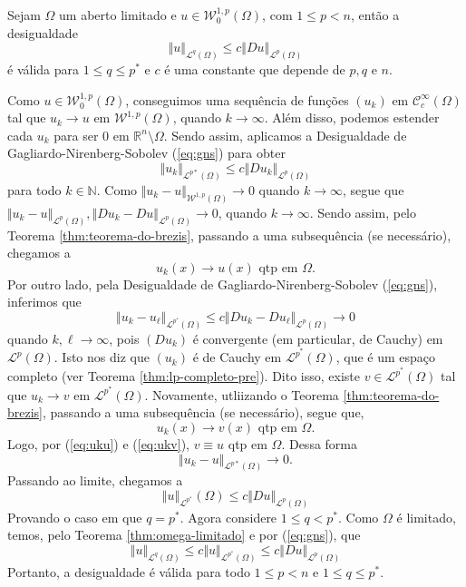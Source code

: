 \documentclass[a4paper, 11pt]{book}
\theoremstyle{definition}
\newcommand{\bN}{\mathbb{N}}
\newcommand{\bR}{\mathbb{R}}
\newcommand{\cC}{\mathcal{C}}
\newcommand{\cL}{\mathcal{L}}
\newcommand{\cW}{\mathcal{W}}
\begin{document}
\begin{tbox}
    Sejam $\Omega$ um aberto limitado e $u \in \cW^{1,p}_0(\Omega)$, com $1 \leqslant p < n$, então a desigualdade
    \[
        \Vert u \Vert_{\cL^q(\Omega)} \leqslant c \Vert Du \Vert_{\cL^p(\Omega)}
    \]
    é válida para $1 \leqslant q \leqslant p^*$ e $c$ é uma constante que depende de $p, q$ e $n$.
\end{tbox}
\begin{prf}
    Como $u \in \cW^{1,p}_0(\Omega)$, conseguimos uma sequência de funções $(u_k)$ em $\cC^{\infty}_c(\Omega)$ tal que $u_k \to u$ em $\cW^{1,p}(\Omega)$, quando $k \to \infty$.
    Além disso, podemos estender cada $u_k$ para ser $0$ em $\bR^n \setminus \Omega$.
    Sendo assim, aplicamos a Desigualdade de Gagliardo-Nirenberg-Sobolev (\ref{eq:gns}) para obter
    \[
        \Vert u_k \Vert_{\cL^{p*}(\Omega)} \leqslant c \Vert Du_k \Vert_{\cL^p(\Omega)}
    \]
    para todo $k \in \bN$.
    Como $\Vert u_k - u \Vert_{\cW^{1,p}(\Omega)} \to 0$ quando $k \to \infty$, segue que $\Vert u_k - u \Vert_{\cL^p(\Omega)}, \Vert Du_k - Du \Vert_{\cL^p(\Omega)} \to 0$, quando $k \to \infty$.
    Sendo assim, pelo Teorema \ref{thm:teorema-do-brezis}, passando a uma subsequência (se necessário), chegamos a
    \begin{equation} \label{eq:uku}
        u_k(x) \to u(x) \text{ qtp em } \Omega.
    \end{equation}
    Por outro lado, pela Desigualdade de Gagliardo-Nirenberg-Sobolev (\ref{eq:gns}), inferimos que
    \[
        \Vert u_k - u_\ell \Vert_{\cL^{p^*}(\Omega)} \leqslant c \Vert Du_k - Du_\ell \Vert_{\cL^p(\Omega)} \to 0
    \]
    quando $k,\ell \to \infty$, pois $(Du_k)$ é convergente (em particular, de Cauchy) em $\cL^p(\Omega)$. Isto nos diz que $(u_k)$ é de Cauchy em $\cL^{p^*}(\Omega)$, que é um espaço completo (ver Teorema \ref{thm:lp-completo-pre}). Dito isso, existe $v \in \cL^{p^*}(\Omega)$ tal que $u_k \to v$ em $\cL^{p^*}(\Omega)$.
    Novamente, utliizando o Teorema \ref{thm:teorema-do-brezis}, passando a uma subsequência (se necessário), segue que,
    \begin{equation} \label{eq:ukv}
        u_k(x) \to v(x) \text{ qtp em } \Omega.
    \end{equation}
    Logo, por (\ref{eq:uku}) e (\ref{eq:ukv}), $v \equiv u$ qtp em $\Omega$.
    Dessa forma
    \[
        \Vert u_k - u \Vert_{\cL^{p*}(\Omega)} \to 0.
    \]
    Passando ao limite, chegamos a
    \[
        \Vert u \Vert_{\cL^{p^*}}(\Omega) \leqslant c \Vert Du \Vert_{\cL^p(\Omega)}
    \]
    Provando o caso em que $q = p^*$. Agora considere $1 \leqslant q < p^*$.
    Como $\Omega$ é limitado, temos, pelo Teorema \ref{thm:omega-limitado} e por (\ref{eq:gns}), que
    \[
        \Vert u \Vert_{\cL^q(\Omega)} \leqslant c\Vert u \Vert_{\cL^{p^*}(\Omega)} \leqslant c \Vert Du \Vert_{\cL^p(\Omega)}
    \]
    Portanto, a desigualdade é válida para todo $1 \leqslant p < n$ e $1 \leqslant q \leqslant p^*$.
\end{prf}
\end{document}
